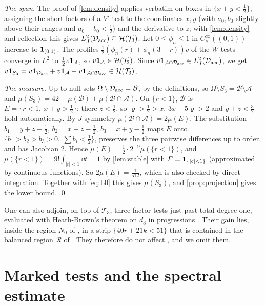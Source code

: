 \documentclass[11pt,colorlinks]{charlie}
\newcommand{\Om}{\Omega}
\begin{document}
\emph{The span.} The proof of \cref{lem:density} applies verbatim on boxes in $\{x+y<\frac12\}$, assigning the short factors of a $V'$-test to the coordinates $x,y$ (with $a_0,b_0$ slightly above their ranges and $a_0+b_0<\frac12$) and the derivative to $z$; with \cref{lem:density} and reflection this gives $L^2_J(\mathcal D_{\rm acc})\subseteq\mathcal H(\mathcal T_3)$. Let $0\le\phi_n\le1$ in $C_c^\infty((0,1))$ increase to $\mathbf{1}_{(0,1)}$. The profiles $\frac12(\phi_n(r)+\phi_n(3-r))v$ of the $W$-tests converge in $L^2$ to $\frac12v\mathbf{1}_{\mathcal A}$, so $v\mathbf{1}_{\mathcal A}\in\mathcal H(\mathcal T_3)$. Since $v\mathbf{1}_{\mathcal A\cap\mathcal D_{\rm acc}}\in L^2_J(\mathcal D_{\rm acc})$, we get $v\mathbf{1}_{S_3}=v\mathbf{1}_{\mathcal D_{\rm acc}}+v\mathbf{1}_{\mathcal A}-v\mathbf{1}_{\mathcal A\cap\mathcal D_{\rm acc}}\in\mathcal H(\mathcal T_3)$.

\emph{The measure.} Up to null sets $\Om\setminus\mathcal D_{\rm acc}=\mathcal B$, by the definitions, so $\Om\setminus S_3=\mathcal B\setminus\mathcal A$ and $\mu(S_3)=42-\mu(\mathcal B)+\mu(\mathcal B\cap\mathcal A)$. On $\{r<1\}$, $\mathcal B$ is $E=\{r<1,\ x+y>\frac12\}$: there $z<\frac12$, so $\varrho>\frac12>x$, $3x+5\varrho>2$ and $y+z<\frac32$ hold automatically. By $J$-symmetry $\mu(\mathcal B\cap\mathcal A)=2\mu(E)$. The substitution $b_1=y+z-\frac12$, $b_2=x+z-\frac12$, $b_3=x+y-\frac12$ maps $E$ onto $\{b_1>b_2>b_3>0,\ \sum b_i<\frac12\}$, preserves the three pairwise differences up to order, and has Jacobian $2$. Hence $\mu(E)=\frac12\cdot2^{-9}\mu(\{r<1\})$, and $\mu(\{r<1\})=9!\int_{|t|<1}\dd t=1$ by \cref{lem:stable} with $F=\mathbf{1}_{\{|c|<1\}}$ (approximated by continuous functions). So $2\mu(E)=\frac1{512}$, which is also checked by direct integration. Together with \eqref{eq:L0} this gives $\mu(S_3)$, and \cref{prop:projection} gives the lower bound. \qed

\begin{remark}
One can also adjoin, on top of $\mathcal T_3$, three-factor tests just past total degree one, evaluated with Heath-Brown's theorem on $d_3$ in progressions \cite{HB}. Their gain lies, inside the region $N_0$ of , in a strip $\{40r+21k<51\}$ that is contained in the balanced region $\mathcal R$ of . They therefore do not affect , and we omit them.
\end{remark}

\section{Marked tests and the spectral estimate}\label{sec:marked}
\end{document}
